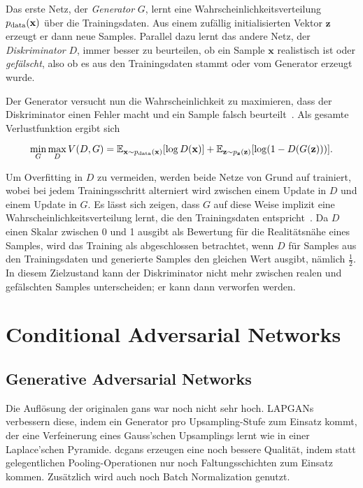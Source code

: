 Das erste Netz, der \emph{Generator} $ G $, lernt eine Wahrscheinlichkeitsverteilung $ p_{\textup{data}}(\mathbf{x}) $ über die Trainingsdaten.
Aus einem zufällig initialisierten Vektor $ \mathbf{z} $ erzeugt er dann neue Samples.
Parallel dazu lernt das andere Netz, der \emph{Diskriminator} $ D $, immer besser zu beurteilen, ob ein Sample $ \mathbf{x} $ realistisch ist oder \emph{gefälscht}, also ob es aus den Trainingsdaten stammt oder vom Generator erzeugt wurde.

Der Generator versucht nun die Wahrscheinlichkeit zu maximieren, dass der Diskriminator einen Fehler macht und ein Sample falsch beurteilt~\cite{Goodfellow.2014}.
Als gesamte Verlustfunktion ergibt sich

\begin{equation}
\min_G \max_D V(D, G) = \mathbb{E}_{\mathbf{x} \sim p_{\textup{data}}(\mathbf{x})} [\log D(\mathbf{x})] + \mathbb{E}_{\mathbf{z} \sim p_{\mathbf{z}}(\mathbf{z})} [\log(1 - D(G(\mathbf{z})))].
\end{equation}

Um Overfitting in $ D $ zu vermeiden, werden beide Netze von Grund auf trainiert, wobei bei jedem Trainingsschritt alterniert wird zwischen einem Update in $ D $ und einem Update in $ G $.
Es lässt sich zeigen, dass $ G $ auf diese Weise implizit eine Wahrscheinlichkeitsverteilung lernt, die den Trainingsdaten entspricht~\cite{Goodfellow.2014}.
Da $ D $ einen Skalar zwischen 0 und 1 ausgibt als Bewertung für die Realitätsnähe eines Samples, wird das Training als abgeschlossen betrachtet, wenn $ D $ für Samples aus den Trainingsdaten und generierte Samples den gleichen Wert ausgibt, nämlich $ \frac{1}{2} $.
In diesem Zielzustand kann der Diskriminator nicht mehr zwischen realen und gefälschten Samples unterscheiden; er kann dann verworfen werden.



\section{Conditional Adversarial Networks}

\subsection{Generative Adversarial Networks}

Die Auflösung der originalen \glspl{gan} war noch nicht sehr hoch.
LAPGANs verbessern diese, indem ein Generator pro Upsampling-Stufe zum Einsatz kommt, der eine Verfeinerung eines Gauss'schen Upsamplings lernt wie in einer Laplace'schen Pyramide.
\glspl{dcgan} erzeugen eine noch bessere Qualität, indem statt gelegentlichen Pooling-Operationen nur noch Faltungsschichten zum Einsatz kommen.
Zusätzlich wird auch noch Batch Normalization genutzt.

